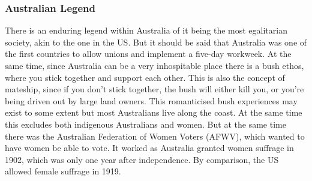 \documentclass{article}
\begin{document}
	\subsubsection{Australian Legend}
	There is an enduring legend within Australia of it being the most egalitarian society, akin to the one in the US. But it should be said that Australia was one of the first countries to allow unions and implement a five-day workweek. At the same time, since Australia can be a very inhospitable place there is a bush ethos, where you stick together and support each other. This is also the concept of mateship, since if you don't stick together, the bush will either kill you, or you're being driven out by large land owners. This romanticised bush experiences may exist to some extent but most Australians live along the coast. At the same time this excludes both indigenous Australians and women. But at the same time there was the Australian Federation of Women Voters (AFWV), which wanted to have women be able to vote. It worked as Australia granted women suffrage in 1902, which was only one year after independence. By comparison, the US allowed female suffrage in 1919.
	
	
	 


	
	
	
























	
\end{document}
